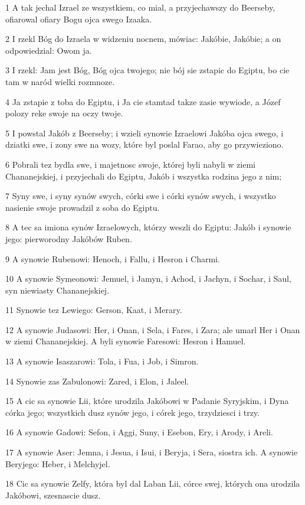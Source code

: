 \par 1 A tak jechal Izrael ze wszystkiem, co mial, a przyjechawszy do Beerseby, ofiarowal ofiary Bogu ojca swego Izaaka.
\par 2 I rzekl Bóg do Izraela w widzeniu nocnem, mówiac: Jakóbie, Jakóbie; a on odpowiedzial: Owom ja.
\par 3 I rzekl: Jam jest Bóg, Bóg ojca twojego; nie bój sie zstapic do Egiptu, bo cie tam w naród wielki rozmnoze.
\par 4 Ja zstapie z toba do Egiptu, i Ja cie stamtad takze zasie wywiode, a Józef polozy reke swoje na oczy twoje.
\par 5 I powstal Jakób z Beerseby; i wzieli synowie Izraelowi Jakóba ojca swego, i dziatki swe, i zony swe na wozy, które byl poslal Farao, aby go przywieziono.
\par 6 Pobrali tez bydla swe, i majetnosc swoje, której byli nabyli w ziemi Chananejskiej, i przyjechali do Egiptu, Jakób i wszystka rodzina jego z nim;
\par 7 Syny swe, i syny synów swych, córki swe i córki synów swych, i wszystko nasienie swoje prowadzil z soba do Egiptu.
\par 8 A tec sa imiona synów Izraelowych, którzy weszli do Egiptu: Jakób i synowie jego: pierworodny Jakóbów Ruben.
\par 9 A synowie Rubenowi: Henoch, i Fallu, i Hesron i Charmi.
\par 10 A synowie Symeonowi: Jemuel, i Jamyn, i Achod, i Jachyn, i Sochar, i Saul, syn niewiasty Chananejskiej.
\par 11 Synowie tez Lewiego: Gerson, Kaat, i Merary.
\par 12 A synowie Judasowi: Her, i Onan, i Sela, i Fares, i Zara; ale umarl Her i Onan w ziemi Chananejskiej. A byli synowie Faresowi: Hesron i Hamuel.
\par 13 A synowie Isaszarowi: Tola, i Fua, i Job, i Simron.
\par 14 Synowie zas Zabulonowi: Zared, i Elon, i Jaleel.
\par 15 A cic sa synowie Lii, które urodzila Jakóbowi w Padanie Syryjskim, i Dyna córka jego; wszystkich dusz synów jego, i córek jego, trzydziesci i trzy.
\par 16 A synowie Gadowi: Sefon, i Aggi, Suny, i Esebon, Ery, i Arody, i Areli.
\par 17 A synowie Aser: Jemna, i Jesua, i Isui, i Beryja, i Sera, siostra ich. A synowie Beryjego: Heber, i Melchyjel.
\par 18 Cic sa synowie Zelfy, która byl dal Laban Lii, córce swej, których ona urodzila Jakóbowi, szesnascie dusz.
